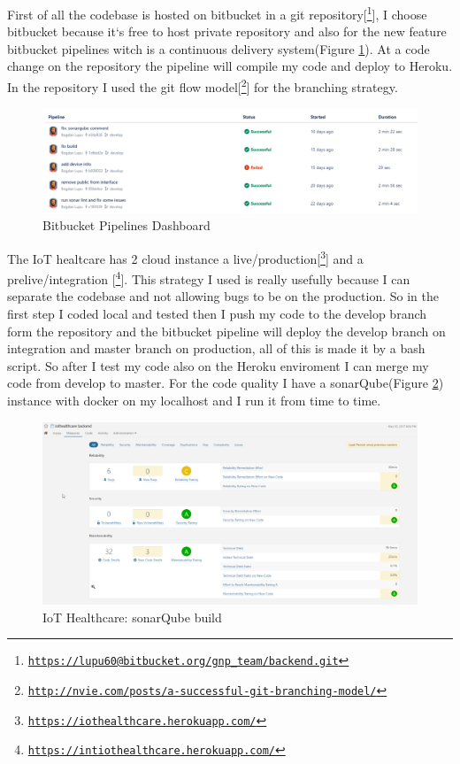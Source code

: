 First of all the codebase is hosted on bitbucket in a git repository[\footnote{\href{https://lupu60@bitbucket.org/gnp\_team/backend.git}{\texttt{https://lupu60@bitbucket.org/gnp\_team/backend.git}}}], I choose bitbucket because it`s free to host private repository and also for the new feature bitbucket pipelines witch is a continuous delivery system(Figure \ref{fig:piplines}). At a code change on the repository the pipeline will compile my code and deploy to Heroku. In the repository I used the git flow model[\footnote{\href{http://nvie.com/posts/a-successful-git-branching-model/}{\texttt{http://nvie.com/posts/a-successful-git-branching-model/}}}] for the branching strategy.
\begin{figure}[h]
	\centering
	\includegraphics[width=\linewidth]{images/pipelines}
	\caption{Bitbucket Pipelines Dashboard}
	\label{fig:piplines}
\end{figure}

The IoT healtcare has 2 cloud instance a live/production[\footnote{\href{https://iothealthcare.herokuapp.com/}{\texttt{https://iothealthcare.herokuapp.com/}}}] and a prelive/integration [\footnote{\href{https://intiothealthcare.herokuapp.com/}{\texttt{https://intiothealthcare.herokuapp.com/}}}]. This strategy I used is really usefully because I can separate the codebase and not allowing bugs to be on the production. So in the first step I coded local and tested then I push my code to the develop branch form the repository and the bitbucket pipeline will deploy the develop branch on integration and master branch on production, all of this is made it by a bash script. So after I test my code also on the Heroku enviroment I can merge my code from develop to master.
For the code quality I have a sonarQube(Figure \ref{fig:sonar}) instance with docker on my localhost and I run it from time to time.
\begin{figure}[h]
	\centering
	\includegraphics[width=\linewidth]{images/sonarqube}
	\caption{IoT Healthcare: sonarQube build}
	\label{fig:sonar}
\end{figure}
\newline


